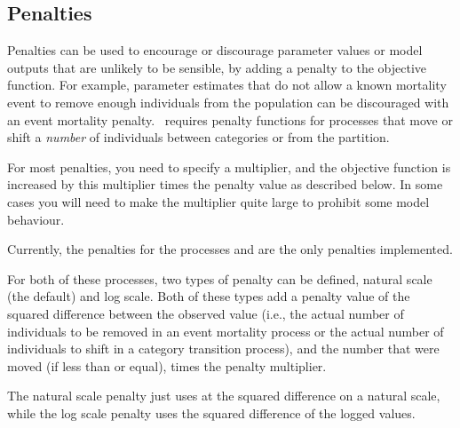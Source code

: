 \subsection{Penalties\label{sec:penalties}}

Penalties can be used to encourage or discourage parameter values or model outputs that are unlikely to be sensible, by adding a penalty to the objective function. For example, parameter estimates that do not allow a known mortality event to remove enough individuals from the population can be discouraged with an event mortality penalty. \SPM\ requires penalty functions for processes that move or shift a \emph{number} of individuals between categories or from the partition.

For most penalties, you need to specify a multiplier, and the objective function is increased by this multiplier times the penalty value as described below. In some cases you will need to make the multiplier quite large to prohibit some model behaviour. 

Currently, the penalties for the processes  and  are the only penalties implemented. 

For both of these processes, two types of penalty can be defined, natural scale (the default) and log scale. Both of these types add a penalty value of the squared difference between the observed value (i.e., the actual number of individuals to be removed in an event mortality process or the actual number of individuals to shift in a category transition process), and the number that were moved (if less than or equal), times the penalty multiplier.

The natural scale penalty just uses at the squared difference on a natural scale, while the log scale penalty uses the squared difference of the logged values. 
